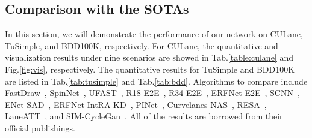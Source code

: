 \documentclass[preprint,12pt,review]{elsarticle}
\begin{document}
\begin{table}
	\centering
	\caption{Quantitative comparison results with other state of the arts on the test set of BDD100K in terms of average per-pexel accuracy and IOU of lane semantic of each frame.}
	\label{tab:bdd}
\end{table}


\subsection{Comparison with the SOTAs}
In this section, we will demonstrate the performance of our network on CULane, TuSimple, and BDD100K, respectively. For CULane, the quantitative and visualization results under nine scenarios are showed in Tab.\ref{table:culane} and Fig.\ref{fig:vis}, respectively.
The quantitative results for TuSimple and BDD100K are listed in Tab.\ref{tab:tusimple} and Tab.\ref{tab:bdd}. Algorithms to compare include FastDraw~\cite{fastdraw}, SpinNet~\cite{spinnet}, UFAST~\cite{ufast}, R18-E2E~\cite{e2e}, R34-E2E~\cite{e2e}, ERFNet-E2E~\cite{e2e}, SCNN~\cite{SCNN}, ENet-SAD~\cite{distillation}, ERFNet-IntRA-KD~\cite{inter}, PINet~\cite{PINet},  Curvelanes-NAS~\cite{curvelane}, RESA~\cite{resa}, LaneATT~\cite{laneatt}, and SIM-CycleGan~\cite{liulane}. All of the results are borrowed from their official publishings. 
\end{document}
